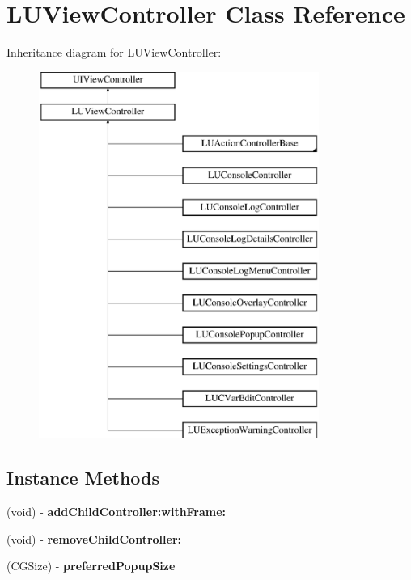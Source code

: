 \hypertarget{interface_l_u_view_controller}{}\section{L\+U\+View\+Controller Class Reference}
\label{interface_l_u_view_controller}
Inheritance diagram for L\+U\+View\+Controller\+:\begin{figure}[H]
\begin{center}
\leavevmode
\includegraphics[height=12.000000cm]{interface_l_u_view_controller}
\end{center}
\end{figure}
\subsection*{Instance Methods}
\begin{DoxyCompactItemize}
\item 
\mbox{\label{interface_l_u_view_controller_aaf2070fe5b883156d986664db6ea9c9c}} 
(void) -\/ {\bfseries add\+Child\+Controller\+:with\+Frame\+:}
\item 
\mbox{\label{interface_l_u_view_controller_a0394a256424e0fa639cb128af2c0acfa}} 
(void) -\/ {\bfseries remove\+Child\+Controller\+:}
\item 
\mbox{\label{interface_l_u_view_controller_aaf13968f545a74810eb202b9df4ee845}} 
(C\+G\+Size) -\/ {\bfseries preferred\+Popup\+Size}
\end{DoxyCompactItemize}
